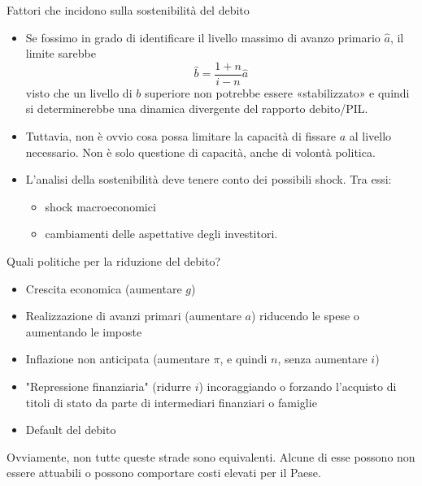 \documentclass[aspectratio=149,11pt,italian]{beamer}
\begin{document}
\begin{frame}{Fattori che incidono sulla sostenibilità del debito}

  \begin{itemize}
  \item Se fossimo in grado di identificare il livello massimo di avanzo
    primario \(\hat a\), il limite sarebbe
    \begin{equation*}
      \hat{b}=\frac{1+n}{i-n}\hat{a}
    \end{equation*}
    visto che un livello di \(b\) superiore non potrebbe essere «stabilizzato»
    e quindi si determinerebbe una dinamica divergente del rapporto
    debito/PIL.
  \item Tuttavia, non è ovvio cosa possa limitare la capacità di fissare \(a\)
    al livello necessario. Non è solo questione di capacità, anche di volontà
    politica.
  \item L'analisi della sostenibilità deve tenere conto dei possibili
    shock. Tra essi:
    \begin{itemize}
    \item shock macroeconomici
    \item cambiamenti delle aspettative degli investitori.
    \end{itemize}
  \end{itemize}
\end{frame}

\begin{frame}{Quali politiche per la riduzione del debito?}

  \begin{itemize}
  \item Crescita economica (aumentare $g$)
  \item Realizzazione di avanzi primari (aumentare $a$) riducendo le spese o
    aumentando le imposte
  \item Inflazione non anticipata (aumentare $\pi$, e quindi $n$, senza
    aumentare $i$)
  \item "Repressione finanziaria" (ridurre $i$) incoraggiando o forzando
    l'acquisto di titoli di stato da parte di intermediari finanziari o
    famiglie
  \item Default del debito
  \end{itemize}

  Ovviamente, non tutte queste strade sono equivalenti. Alcune di esse possono
  non essere attuabili o possono comportare costi elevati per il Paese.
\end{frame}
\end{document}
